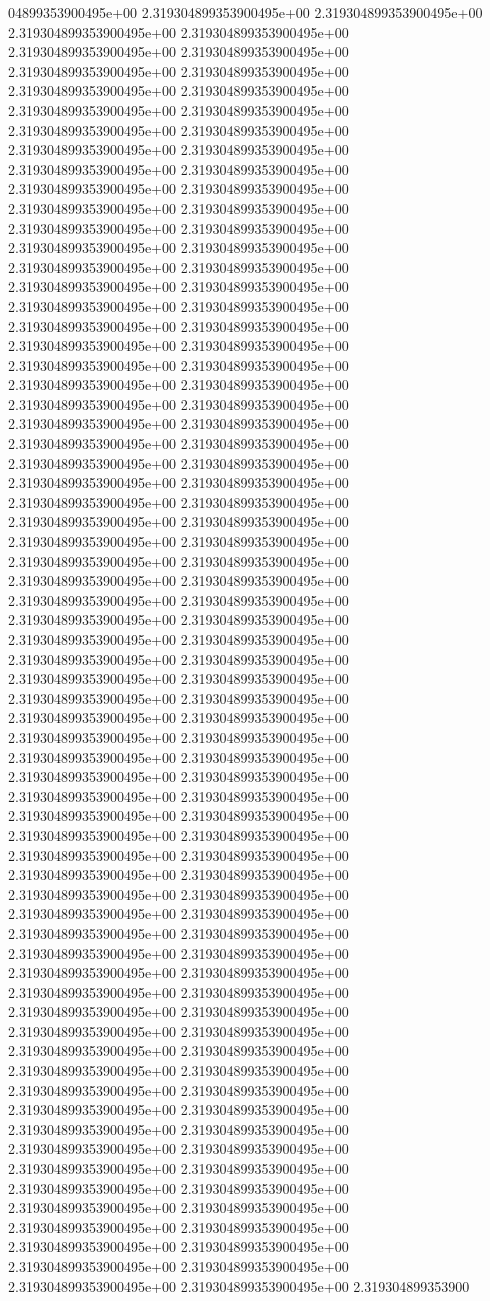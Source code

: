 04899353900495e+00	2.319304899353900495e+00	2.319304899353900495e+00	2.319304899353900495e+00	2.319304899353900495e+00	2.319304899353900495e+00	2.319304899353900495e+00	2.319304899353900495e+00	2.319304899353900495e+00	2.319304899353900495e+00	2.319304899353900495e+00	2.319304899353900495e+00	2.319304899353900495e+00	2.319304899353900495e+00	2.319304899353900495e+00	2.319304899353900495e+00	2.319304899353900495e+00	2.319304899353900495e+00	2.319304899353900495e+00	2.319304899353900495e+00	2.319304899353900495e+00	2.319304899353900495e+00	2.319304899353900495e+00	2.319304899353900495e+00	2.319304899353900495e+00	2.319304899353900495e+00	2.319304899353900495e+00	2.319304899353900495e+00	2.319304899353900495e+00	2.319304899353900495e+00	2.319304899353900495e+00	2.319304899353900495e+00	2.319304899353900495e+00	2.319304899353900495e+00	2.319304899353900495e+00	2.319304899353900495e+00	2.319304899353900495e+00	2.319304899353900495e+00	2.319304899353900495e+00	2.319304899353900495e+00	2.319304899353900495e+00	2.319304899353900495e+00	2.319304899353900495e+00	2.319304899353900495e+00	2.319304899353900495e+00	2.319304899353900495e+00	2.319304899353900495e+00	2.319304899353900495e+00	2.319304899353900495e+00	2.319304899353900495e+00	2.319304899353900495e+00	2.319304899353900495e+00	2.319304899353900495e+00	2.319304899353900495e+00	2.319304899353900495e+00	2.319304899353900495e+00	2.319304899353900495e+00	2.319304899353900495e+00	2.319304899353900495e+00	2.319304899353900495e+00	2.319304899353900495e+00	2.319304899353900495e+00	2.319304899353900495e+00	2.319304899353900495e+00	2.319304899353900495e+00	2.319304899353900495e+00	2.319304899353900495e+00	2.319304899353900495e+00	2.319304899353900495e+00	2.319304899353900495e+00	2.319304899353900495e+00	2.319304899353900495e+00	2.319304899353900495e+00	2.319304899353900495e+00	2.319304899353900495e+00	2.319304899353900495e+00	2.319304899353900495e+00	2.319304899353900495e+00	2.319304899353900495e+00	2.319304899353900495e+00	2.319304899353900495e+00	2.319304899353900495e+00	2.319304899353900495e+00	2.319304899353900495e+00	2.319304899353900495e+00	2.319304899353900495e+00	2.319304899353900495e+00	2.319304899353900495e+00	2.319304899353900495e+00	2.319304899353900495e+00	2.319304899353900495e+00	2.319304899353900495e+00	2.319304899353900495e+00	2.319304899353900495e+00	2.319304899353900495e+00	2.319304899353900495e+00	2.319304899353900495e+00	2.319304899353900495e+00	2.319304899353900495e+00	2.319304899353900495e+00	2.319304899353900495e+00	2.319304899353900495e+00	2.319304899353900495e+00	2.319304899353900495e+00	2.319304899353900495e+00	2.319304899353900495e+00	2.319304899353900495e+00	2.319304899353900495e+00	2.319304899353900495e+00	2.319304899353900495e+00	2.319304899353900495e+00	2.319304899353900495e+00	2.319304899353900495e+00	2.319304899353900495e+00	2.319304899353900495e+00	2.319304899353900495e+00	2.319304899353900495e+00	2.319304899353900495e+00	2.319304899353900495e+00	2.319304899353900495e+00	2.319304899353900495e+00	2.319304899353900495e+00	2.319304899353900495e+00	2.319304899353900495e+00	2.319304899353900495e+00	2.319304899353900495e+00	2.319304899353900495e+00	2.319304899353900495e+00	2.319304899353900495e+00	2.319304899353900495e+00	2.319304899353900495e+00	2.319304899353900495e+00	2.319304899353900495e+00	2.319304899353900